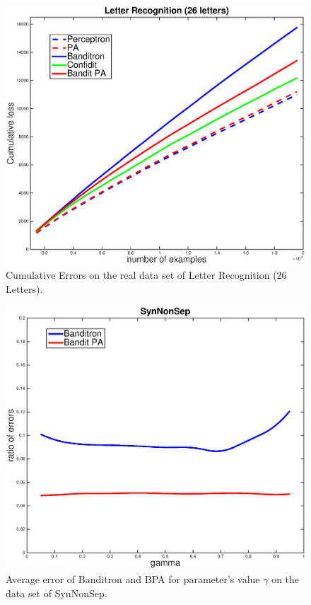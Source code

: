 \begin{figure}[h!]
\centerline{
\includegraphics[scale = 0.4]{fig05/mc/26LR.eps}}
\caption{Cumulative Errors on the real data set of Letter Recognition (26 Letters).}
\label{pic:BPALR26}
\end{figure}

\begin{figure}[h!]
\centerline{
\includegraphics[scale = 0.4]{fig05/mc/SynNonSep_gamma.eps}}
\caption{Average error of Banditron and BPA for parameter's value $\gamma$ on the data set of SynNonSep.}
\label{pic:BPASNSerr}
\end{figure}

